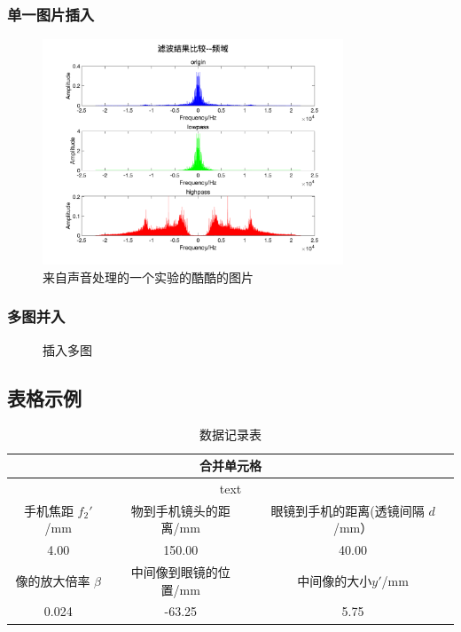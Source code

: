 \documentclass{article}
\begin{document}
\subsubsection{单一图片插入}
\begin{figure}[H]
\centering
\includegraphics[width=0.8\textwidth]{filter-result-frequency}
\caption{来自声音处理的一个实验的酷酷的图片}
\end{figure}

\subsubsection{多图并入}
\begin{figure}[H]
\centering    
{}     

\caption{插入多图}  
      
\end{figure}



\subsection{表格示例}
\begin{table}[H]
  \centering
  \caption{数据记录表}
    \begin{tabular}{|c|c|c|}
    \hline
    \multicolumn{3}{|c|}{合并单元格}\\
    \hline
    \multicolumn{3}{|c|}{text}\\
    \hline
    手机焦距 $f_2'$/mm & 物到手机镜头的距离/mm &眼镜到手机的距离(透镜间隔 $d$/mm）\\
    \hline
    4.00  & 150.00  & 40.00  \\
    \hline
    像的放大倍率 $\beta$ &中间像到眼镜的位置/mm &中间像的大小$y'$/mm\\
    \hline
    0.024  & -63.25 & 5.75 \\
    \hline
    \end{tabular}
\end{table}
\end{document}
